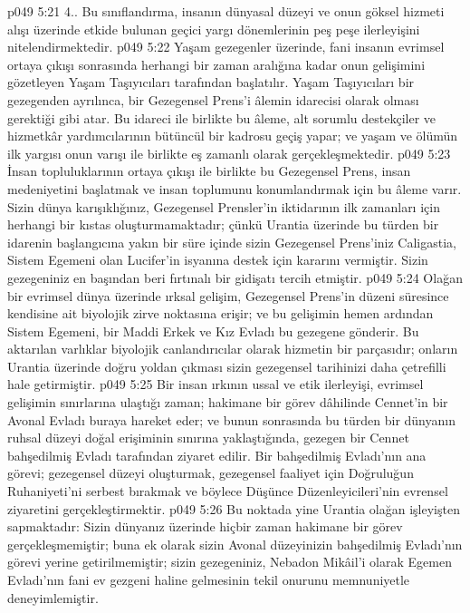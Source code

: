 \vs p049 5:21 4.\bibnobreakspace {}. Bu sınıflandırma, insanın dünyasal düzeyi ve onun göksel hizmeti alışı üzerinde etkide bulunan geçici yargı dönemlerinin peş peşe ilerleyişini nitelendirmektedir.
\vs p049 5:22 Yaşam gezegenler üzerinde, fani insanın evrimsel ortaya çıkışı sonrasında herhangi bir zaman aralığına kadar onun gelişimini gözetleyen Yaşam Taşıyıcıları tarafından başlatılır. Yaşam Taşıyıcıları bir gezegenden ayrılınca, bir Gezegensel Prens’i âlemin idarecisi olarak olması gerektiği gibi atar. Bu idareci ile birlikte bu âleme, alt sorumlu destekçiler ve hizmetkâr yardımcılarının bütüncül bir kadrosu geçiş yapar; ve yaşam ve ölümün ilk yargısı onun varışı ile birlikte eş zamanlı olarak gerçekleşmektedir.
\vs p049 5:23 İnsan topluluklarının ortaya çıkışı ile birlikte bu Gezegensel Prens, insan medeniyetini başlatmak ve insan toplumunu konumlandırmak için bu âleme varır. Sizin dünya karışıklığınız, Gezegensel Prensler’in iktidarının ilk zamanları için herhangi bir kıstas oluşturmamaktadır; çünkü Urantia üzerinde bu türden bir idarenin başlangıcına yakın bir süre içinde sizin Gezegensel Prens’iniz Caligastia, Sistem Egemeni olan Lucifer’in isyanına destek için kararını vermiştir. Sizin gezegeniniz en başından beri fırtınalı bir gidişatı tercih etmiştir.
\vs p049 5:24 Olağan bir evrimsel dünya üzerinde ırksal gelişim, Gezegensel Prens’in düzeni süresince kendisine ait biyolojik zirve noktasına erişir; ve bu gelişimin hemen ardından Sistem Egemeni, bir Maddi Erkek ve Kız Evladı bu gezegene gönderir. Bu aktarılan varlıklar biyolojik canlandırıcılar olarak hizmetin bir parçasıdır; onların Urantia üzerinde doğru yoldan çıkması sizin gezegensel tarihinizi daha çetrefilli hale getirmiştir.
\vs p049 5:25 Bir insan ırkının ussal ve etik ilerleyişi, evrimsel gelişimin sınırlarına ulaştığı zaman; hakimane bir görev dâhilinde Cennet’in bir Avonal Evladı buraya hareket eder; ve bunun sonrasında bu türden bir dünyanın ruhsal düzeyi doğal erişiminin sınırına yaklaştığında, gezegen bir Cennet bahşedilmiş Evladı tarafından ziyaret edilir. Bir bahşedilmiş Evladı’nın ana görevi; gezegensel düzeyi oluşturmak, gezegensel faaliyet için Doğruluğun Ruhaniyeti’ni serbest bırakmak ve böylece Düşünce Düzenleyicileri’nin evrensel ziyaretini gerçekleştirmektir.
\vs p049 5:26 Bu noktada yine Urantia olağan işleyişten sapmaktadır: Sizin dünyanız üzerinde hiçbir zaman hakimane bir görev gerçekleşmemiştir; buna ek olarak sizin Avonal düzeyinizin bahşedilmiş Evladı’nın görevi yerine getirilmemiştir; sizin gezegeniniz, Nebadon Mikâil’i olarak Egemen Evladı’nın fani ev gezgeni haline gelmesinin tekil onurunu memnuniyetle deneyimlemiştir.
